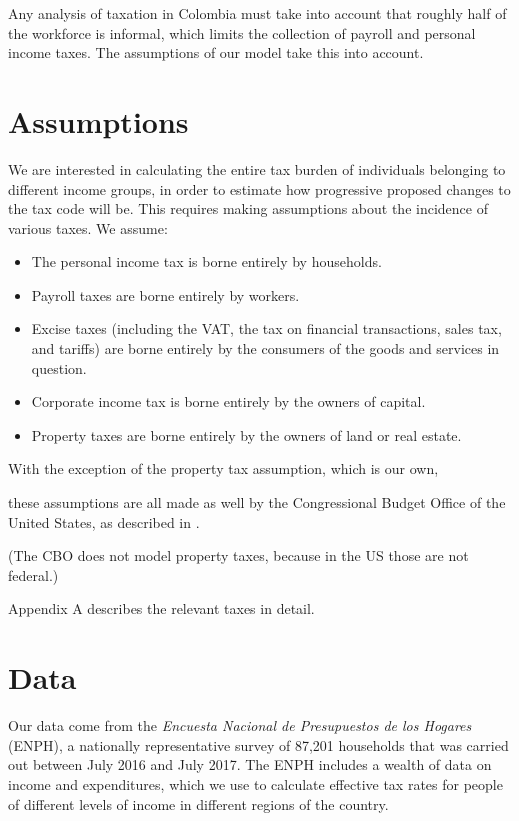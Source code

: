 \documentclass[12pt]{article}
\begin{document}
Any analysis of taxation in Colombia must take into account that
roughly half of the workforce is informal,
which limits the collection of payroll and personal income taxes.
The assumptions of our model take this into account.

\section{Assumptions}

We are interested in calculating
the entire tax burden of individuals belonging to different income groups,
in order to
estimate how progressive proposed changes to the tax code will be.
This requires making assumptions about
the incidence of various taxes. We assume:

\begin{itemize}
  \item The personal income tax is borne entirely by households.
  \item Payroll taxes are borne entirely by workers.
  \item Excise taxes
    (including the VAT,
    the tax on financial transactions,
    sales tax, and tariffs)
    are borne entirely by
    the consumers of the goods and services in question.
  \item Corporate income tax is borne entirely by the owners of capital.
  \item Property taxes are borne entirely by
    the owners of land or real estate.
\end{itemize}

With the exception of the property tax assumption,
which is our own,
\iffalse
    [[LUIS:
        It is, right?]]
\fi
these assumptions are all made as well by
the Congressional Budget Office of the United States,
as described in \citet{salanie}.
\iffalse
    [[AN ECONOMIST::
        Who is salanie? That string only appears once in the entire document.
        --jbb]]
\fi
(The CBO does not model property taxes,
because in the US those are not federal.)

Appendix A describes the relevant taxes in detail.

\section{Data}
Our data come from the
\textit{Encuesta Nacional de Presupuestos de los Hogares} (ENPH),
a nationally representative survey of 87,201 households
that was carried out between July 2016 and July 2017.
The ENPH includes a wealth of data on income and expenditures,
which we use to calculate effective tax rates for
people of different levels of income in different regions of the country.
\end{document}
